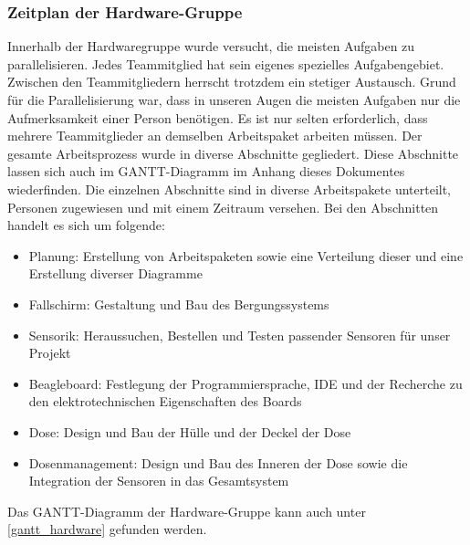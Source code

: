 \subsubsection{Zeitplan der Hardware-Gruppe}
Innerhalb der Hardwaregruppe wurde versucht, die meisten Aufgaben zu parallelisieren. Jedes Teammitglied hat sein eigenes spezielles Aufgabengebiet. Zwischen den Teammitgliedern herrscht trotzdem ein stetiger Austausch. Grund für die Parallelisierung war, dass in unseren Augen die meisten Aufgaben  nur die Aufmerksamkeit einer Person benötigen. Es ist nur selten erforderlich, dass mehrere Teammitglieder an demselben Arbeitspaket arbeiten müssen. Der gesamte Arbeitsprozess wurde in diverse Abschnitte gegliedert. Diese Abschnitte lassen sich auch im GANTT-Diagramm im Anhang dieses Dokumentes wiederfinden. Die einzelnen Abschnitte sind in diverse Arbeitspakete unterteilt, Personen zugewiesen und mit einem Zeitraum versehen. Bei den Abschnitten handelt es sich um folgende:
\begin{itemize}
\item Planung: Erstellung von Arbeitspaketen sowie eine Verteilung dieser und eine Erstellung diverser Diagramme
\item Fallschirm: Gestaltung und Bau des Bergungssystems
\item Sensorik: Heraussuchen, Bestellen und Testen passender Sensoren für unser Projekt
\item Beagleboard: Festlegung der Programmiersprache, IDE und der Recherche zu den elektrotechnischen Eigenschaften des Boards
\item Dose: Design und Bau der Hülle und der Deckel der Dose
\item Dosenmanagement: Design und Bau des Inneren der Dose sowie die Integration der Sensoren in das Gesamtsystem
\end{itemize}

Das GANTT-Diagramm der Hardware-Gruppe kann auch unter \ref{gantt_hardware} gefunden werden.

